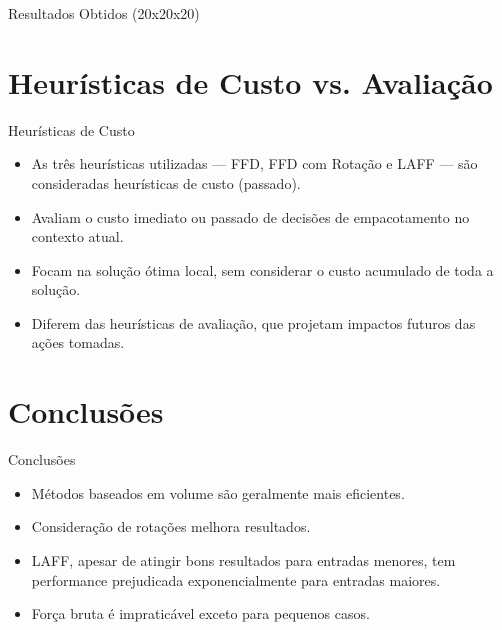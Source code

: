 \documentclass{beamer}
\begin{document}
\begin{frame}{Resultados Obtidos (20x20x20)}
	\begin{table}[]
		\centering
		\caption{Container 20x20x20 com 15 caixas}
	\end{table}
\end{frame}

\section{Heurísticas de Custo vs. Avaliação}
\begin{frame}{Heurísticas de Custo}
	\begin{itemize}
		\item As três heurísticas utilizadas — FFD, FFD com Rotação e LAFF — são consideradas heurísticas de custo (passado).
		\item Avaliam o custo imediato ou passado de decisões de empacotamento no contexto atual.
		\item Focam na solução ótima local, sem considerar o custo acumulado de toda a solução.
		\item Diferem das heurísticas de avaliação, que projetam impactos futuros das ações tomadas.
	\end{itemize}
\end{frame}

\section{Conclusões}
\begin{frame}{Conclusões}
	\begin{itemize}
		\item Métodos baseados em volume são geralmente mais eficientes.
		\item Consideração de rotações melhora resultados.
		\item LAFF, apesar de atingir bons resultados para entradas menores, tem performance prejudicada exponencialmente para entradas maiores.
		\item Força bruta é impraticável exceto para pequenos casos.
	\end{itemize}
\end{frame}
\end{document}
